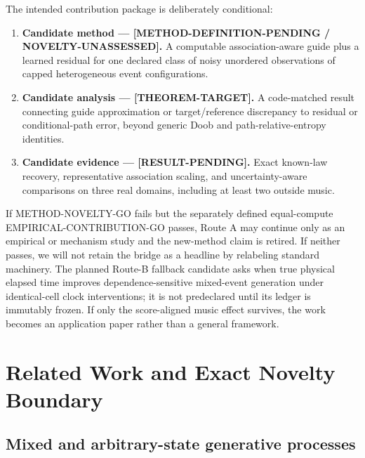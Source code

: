 \documentclass[11pt]{article}
\newcommand{\status}[1]{%
  \textcolor{statusred}{\textbf{\texttt{[#1]}}}%
}
\newcommand{\code}[1]{\nolinkurl{#1}}
\def\status#1{[#1]}%
\def\code#1{#1}%
\begin{document}
The intended contribution package is deliberately conditional:

\begin{enumerate}
\item \textbf{Candidate method --- \status{METHOD-DEFINITION-PENDING /\allowbreak{} NOVELTY-UNASSESSED}.} A computable association-aware guide plus a learned residual for one declared class of noisy unordered observations of capped heterogeneous event configurations.
\item \textbf{Candidate analysis --- \status{THEOREM-TARGET}.} A code-matched result connecting guide approximation or target/\allowbreak{}reference discrepancy to residual or conditional-path error, beyond generic Doob and path-relative-entropy identities.
\item \textbf{Candidate evidence --- \status{RESULT-PENDING}.} Exact known-law recovery, representative association scaling, and uncertainty-aware comparisons on three real domains, including at least two outside music.
\end{enumerate}

If \code{METHOD-NOVELTY-GO} fails but the separately defined equal-compute \code{EMPIRICAL-CONTRIBUTION-GO} passes, Route A may continue only as an empirical or mechanism study and the new-method claim is retired. If neither passes, we will not retain the bridge as a headline by relabeling standard machinery. The planned Route-B fallback candidate asks when true physical elapsed time improves dependence-sensitive mixed-event generation under identical-cell clock interventions; it is not predeclared until its ledger is immutably frozen. If only the score-aligned music effect survives, the work becomes an application paper rather than a general framework.

\section{Related Work and Exact Novelty Boundary}
\label{sec:related-work-and-exact-novelty-boundary}

\subsection{Mixed and arbitrary-state generative processes}
\label{sec:mixed-and-arbitrary-state-generative-processes}
\end{document}

